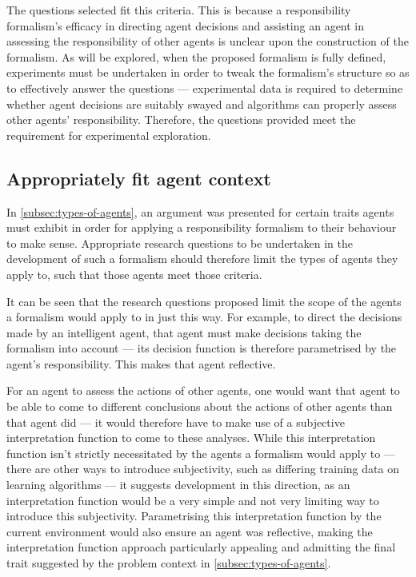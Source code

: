 The questions selected fit this criteria. This is because a responsibility formalism's efficacy in directing agent decisions and assisting an agent in assessing the responsibility of other agents is unclear upon the construction of the formalism. As will be explored, when the proposed formalism is fully defined, experiments must be undertaken in order to tweak the formalism's structure so as to effectively answer the questions --- experimental data is required to determine whether agent decisions are suitably swayed and algorithms can properly assess other agents' responsibility. Therefore, the questions provided meet the requirement for experimental exploration.\par

\subsection{Appropriately fit agent context}
In \cref{subsec:types-of-agents}, an argument was presented for certain traits agents must exhibit in order for applying a responsibility formalism to their behaviour to make sense. Appropriate research questions to be undertaken in the development of such a formalism should therefore limit the types of agents they apply to, such that those agents meet those criteria.\par

It can be seen that the research questions proposed limit the scope of the agents a formalism would apply to in just this way. For example, to direct the decisions made by an intelligent agent, that agent must make decisions taking the formalism into account --- its decision function is therefore parametrised by the agent's responsibility. This makes that agent reflective. \par

For an agent to assess the actions of other agents, one would want that agent to be able to come to different conclusions about the actions of other agents than that agent did --- it would therefore have to make use of a subjective interpretation function to come to these analyses. While this interpretation function isn't strictly necessitated by the agents a formalism would apply to --- there are other ways to introduce subjectivity, such as differing training data on learning algorithms --- it suggests development in this direction, as an interpretation function would be a very simple and not very limiting way to introduce this subjectivity. Parametrising this interpretation function by the current environment would also ensure an agent was reflective, making the interpretation function approach particularly appealing and admitting the final trait suggested by the problem context in \cref{subsec:types-of-agents}.\par


